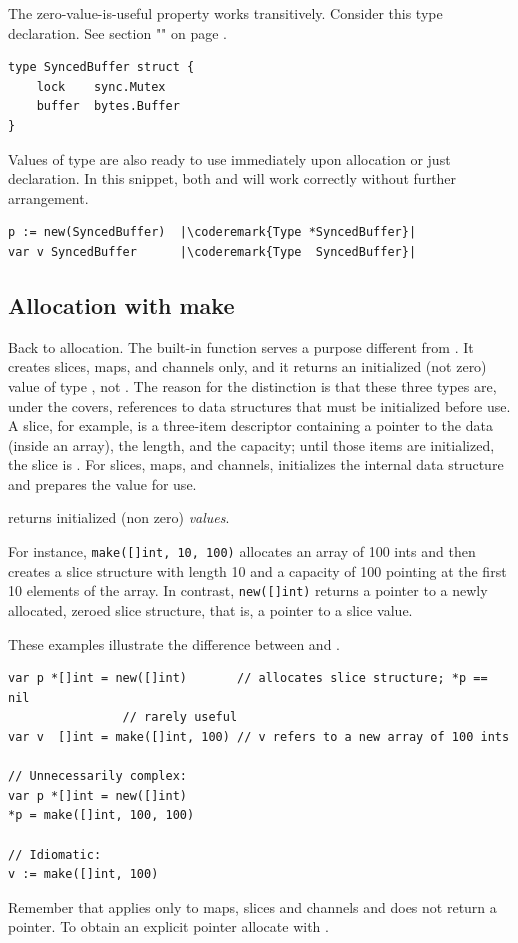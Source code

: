 The zero-value-is-useful property works transitively. Consider this type
declaration. See section "" on page
\pageref{sec:defining your own}.

\begin{lstlisting}
type SyncedBuffer struct {
    lock    sync.Mutex
    buffer  bytes.Buffer
}
\end{lstlisting}
Values of type  are also ready to use immediately upon
allocation or just declaration. In this snippet, both  and
 will work
correctly without further arrangement.
\begin{lstlisting}
p := new(SyncedBuffer)  |\coderemark{Type *SyncedBuffer}|
var v SyncedBuffer      |\coderemark{Type  SyncedBuffer}|
\end{lstlisting}

\subsection{Allocation with make}
\label{sec:allocation with make}
Back to allocation. The built-in function  serves a purpose
different from . It creates slices, maps, and channels only, and
it returns an initialized (not zero) value of type , not
. The reason
for the distinction is that these three types are, under the covers,
references to data structures that must be initialized before use. A
slice, for example, is a three-item descriptor containing a pointer to
the data (inside an array), the length, and the capacity; until those
items are initialized, the slice is . For slices, maps, and channels,
 initializes the internal data structure and prepares the value for
use. 

\begin{lbar}[]
 returns initialized (non zero) \emph{values}.
\end{lbar}

For instance,
\lstinline{make([]int, 10, 100)}
allocates an array of 100 ints and then creates a slice structure with
length 10 and a capacity of 100 pointing at the first 10 elements of the
array. In contrast,
\lstinline{new([]int)} returns
a pointer to a newly allocated, zeroed slice structure, that is, a
pointer to a  slice value.

These examples illustrate the difference between  and
.
\begin{lstlisting}
var p *[]int = new([]int)       // allocates slice structure; *p == nil
				// rarely useful
var v  []int = make([]int, 100) // v refers to a new array of 100 ints

// Unnecessarily complex:
var p *[]int = new([]int)
*p = make([]int, 100, 100)

// Idiomatic:
v := make([]int, 100)
\end{lstlisting}
Remember that  applies only to maps, slices and channels and does
not return a pointer. To obtain an explicit pointer allocate with
.

